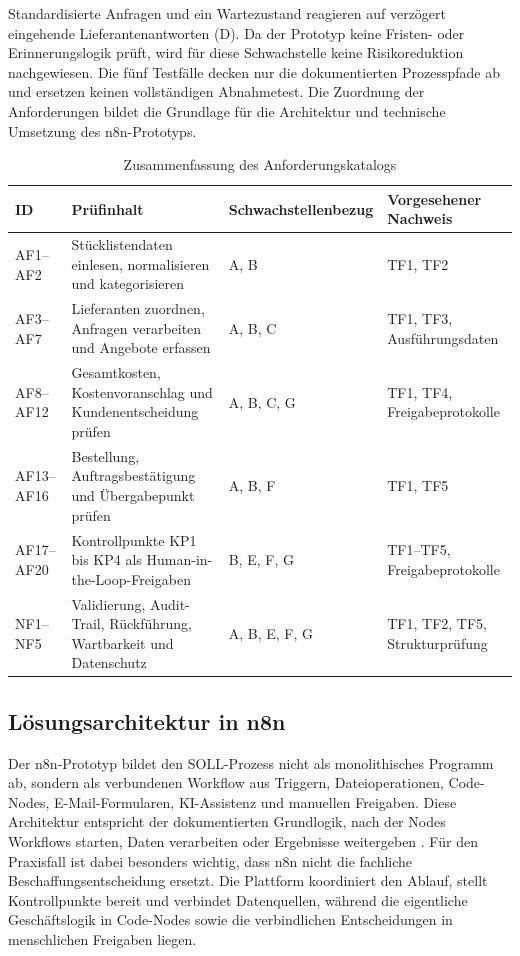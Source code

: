 \documentclass[a4paper,12pt]{article}
\begin{document}
Standardisierte Anfragen und ein Wartezustand reagieren auf verzögert eingehende Lieferantenantworten (D). Da der Prototyp keine Fristen- oder Erinnerungslogik prüft, wird für diese Schwachstelle keine Risikoreduktion nachgewiesen. Die fünf Testfälle decken nur die dokumentierten Prozesspfade ab und ersetzen keinen vollständigen Abnahmetest. Die Zuordnung der Anforderungen bildet die Grundlage für die Architektur und technische Umsetzung des n8n-Prototyps.

\begin{table}[H]
    \captionsetup{justification=raggedright,singlelinecheck=false}
    \caption{Zusammenfassung des Anforderungskatalogs}
    \label{tab:anforderungskatalog-zusammenfassung}
    \footnotesize
    \begin{tabularx}{\textwidth}{@{}lXlX@{}}
        \toprule
        ID & Prüfinhalt & Schwachstellenbezug & Vorgesehener Nachweis \\
        \midrule
        AF1--AF2 & Stücklistendaten einlesen, normalisieren und kategorisieren & A, B & TF1, TF2 \\
        \midrule
        AF3--AF7 & Lieferanten zuordnen, Anfragen verarbeiten und Angebote erfassen & A, B, C & TF1, TF3, Ausführungsdaten \\
        \midrule
        AF8--AF12 & Gesamtkosten, Kostenvoranschlag und Kundenentscheidung prüfen & A, B, C, G & TF1, TF4, Freigabeprotokolle \\
        \midrule
        AF13--AF16 & Bestellung, Auftragsbestätigung und Übergabepunkt prüfen & A, B, F & TF1, TF5 \\
        \midrule
        AF17--AF20 & Kontrollpunkte KP1 bis KP4 als Human-in-the-Loop-Freigaben & B, E, F, G & TF1--TF5, Freigabeprotokolle \\
        \midrule
        NF1--NF5 & Validierung, Audit-Trail, Rückführung, Wartbarkeit und Datenschutz & A, B, E, F, G & TF1, TF2, TF5, Strukturprüfung \\
        \bottomrule
    \end{tabularx}
\end{table}

\subsection{Lösungsarchitektur in n8n}
Der n8n-Prototyp bildet den SOLL-Prozess nicht als monolithisches Programm ab, sondern als verbundenen Workflow aus Triggern, Dateioperationen, Code-Nodes, E-Mail-Formularen, KI-Assistenz und manuellen Freigaben. Diese Architektur entspricht der dokumentierten Grundlogik, nach der Nodes Workflows starten, Daten verarbeiten oder Ergebnisse weitergeben \parencite{n8n_docs_2026}. Für den Praxisfall ist dabei besonders wichtig, dass n8n nicht die fachliche Beschaffungsentscheidung ersetzt. Die Plattform koordiniert den Ablauf, stellt Kontrollpunkte bereit und verbindet Datenquellen, während die eigentliche Geschäftslogik in Code-Nodes sowie die verbindlichen Entscheidungen in menschlichen Freigaben liegen.
\end{document}
